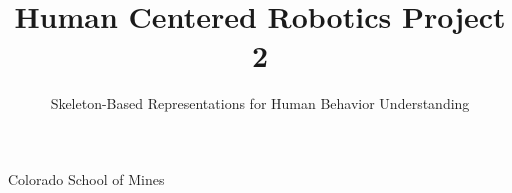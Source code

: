\documentclass[11pt,nocopyrightspace]{config}
\begin{document}
\setlength{\pdfpageheight}{\paperheight}
\setlength{\pdfpagewidth}{\paperwidth}






\title{Human Centered Robotics Project 2}
\subtitle{Skeleton-Based Representations for Human Behavior Understanding}

           {Colorado School of Mines}

\maketitle
\end{document}
